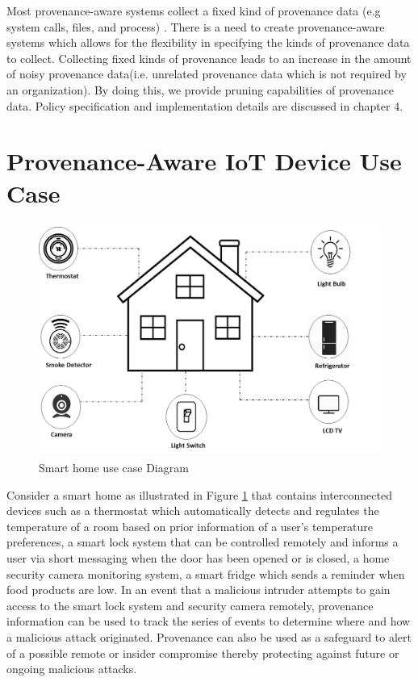 Most provenance-aware systems collect a fixed kind of provenance data (e.g system calls, files, and process)  \cite{King:2003:BI:945445.945467, altintas,glavic_case_2011}. There is a need to create provenance-aware systems which allows for the flexibility in specifying the kinds of provenance data to collect. Collecting fixed kinds of provenance leads to  an increase in the amount of noisy provenance data(i.e. unrelated provenance data which is not required by an organization). By doing this, we provide pruning capabilities \cite{braun2006issues} of provenance data. Policy specification and implementation details are discussed in chapter 4.  










\section{Provenance-Aware IoT Device Use Case}

\begin{figure}[tb]
\begin{center}
\includegraphics[height=3in]{smart_home_use_case.png}
\end{center}
\caption{Smart home use case Diagram}
\label{smart_home}
\end{figure}



Consider a smart home as illustrated in Figure \ref{smart_home} that contains interconnected devices such as a thermostat which automatically detects and regulates the temperature of a room based on prior information of a user's temperature preferences, a smart lock system that can be controlled remotely and informs a user via short messaging when the door has been opened or is closed, a home security camera monitoring system, a smart fridge which sends a reminder when food products are low. In an event that a malicious intruder attempts  to gain access to the smart lock system and security camera remotely, provenance information can be used to track the series  of events to determine where and how a malicious attack originated. Provenance can also be used as a safeguard to alert of a possible remote or insider compromise thereby protecting against future or ongoing malicious attacks. 





